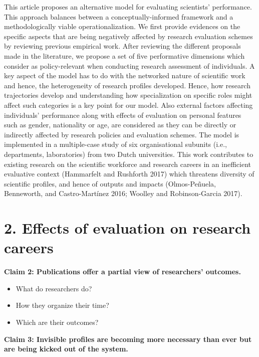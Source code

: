 \documentclass[]{elsarticle} %
\providecommand{\tightlist}{%
  \setlength{\itemsep}{0pt}\setlength{\parskip}{0pt}}
\begin{document}
This article proposes an alternative model for evaluating scientists'
performance. This approach balances between a conceptually-informed
framework and a methodologically viable operationalization. We first
provide evidences on the specific aspects that are being negatively
affected by research evaluation schemes by reviewing previous empirical
work. After reviewing the different proposals made in the literature, we
propose a set of five performative dimensions which consider as
policy-relevant when conducting research assessment of individuals. A
key aspect of the model has to do with the networked nature of
scientific work and hence, the heterogeneity of research profiles
developed. Hence, how research trajectories develop and understanding
how specialization on specific roles might affect such categories is a
key point for our model. Also external factors affecting individuals'
performance along with effects of evaluation on personal features such
as gender, nationality or age, are considered as they can be directly or
indirectly affected by research policies and evaluation schemes. The
model is implemented in a multiple-case study of six organisational
subunits (i.e., departments, laboratories) from two Dutch universities.
This work contributes to existing research on the scientific workforce
and research careers in an inefficient evaluative context (Hammarfelt
and Rushforth 2017) which threatens diversity of scientific profiles,
and hence of outputs and impacts (Olmos-Peñuela, Benneworth, and
Castro-Martínez 2016; Woolley and Robinson-Garcia 2017).

\hypertarget{effects-of-evaluation-on-research-careers}{%
\section{2. Effects of evaluation on research
careers}\label{effects-of-evaluation-on-research-careers}}

\textbf{Claim 2: Publications offer a partial view of researchers'
outcomes.}

\begin{itemize}
\tightlist
\item
  What do researchers do?
\item
  How they organize their time?
\item
  Which are their outcomes?
\end{itemize}

\textbf{Claim 3: Invisible profiles are becoming more necessary than
ever but are being kicked out of the system.}
\end{document}
